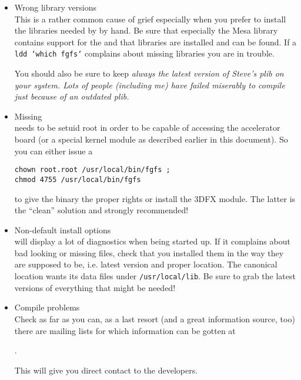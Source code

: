 \begin{itemize}
  

\item{Wrong library versions}\\
  This is a rather common cause of grief especially when you prefer to
  install the libraries needed by \FlightGear by hand. Be sure that
  especially the Mesa library contains support for the  and that  libraries are installed and can be
  found. If a \texttt{ldd `which fgfs`} complains about missing
  libraries you are in trouble.
  
  You should also be sure to keep \em{always} the \em{latest} version
  of Steve's plib on your system. Lots of people (including me) have
  failed miserably to compile \FlightGear just because of an outdated
  plib.
  

\item{Missing }\\
  \FlightGear needs to be setuid root in order to be capable of
  accessing the accelerator board (or a special kernel module as
  described earlier in this document). So you can either issue a

  \texttt{chown root.root /usr/local/bin/fgfs ;}\\
  \texttt{chmod 4755 /usr/local/bin/fgfs}
  
  to give the \FlightGear binary the proper rights or install the 3DFX module. The latter is the ``clean''
  solution and strongly recommended!


\item{Non-default install options}\\
  \FlightGear will display a lot of diagnostics when being started up.
  If it complains about bad looking or missing files, check that you
  installed them in the way they are supposed to be, i.e. latest
  version and proper location. The canonical location \FlightGear
  wants its data files under \texttt{/usr/local/lib}. Be sure to
  grab the latest versions of everything that might be needed!

\item{Compile problems}\\
  Check as far as you can, as a last resort (and a great information
  source, too) there are mailing lists for which information can be
  gotten at

  .

This will give you direct contact to the developers.


\end{itemize}
